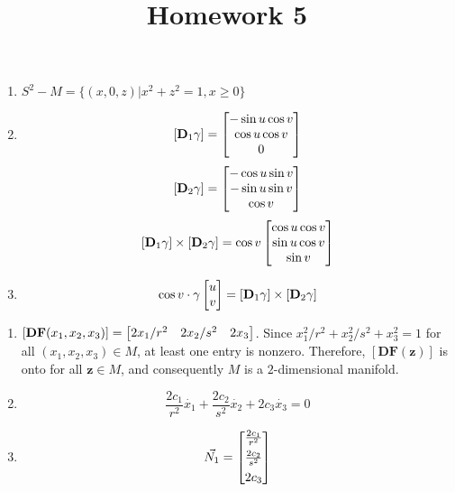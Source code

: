 \documentclass{homework}
\title{Homework 5}
\begin{document}
\maketitle

\begin{problem}{1}
\begin{enumerate}
\item $S^2 - M = \{(x, 0, z) | x^2 + z^2 = 1, x \geq 0\}$

\item
$$[\mathbf{D}_1\gamma] = \begin{bmatrix}-\sin u \cos v\\
                                \cos u \cos v\\
                                0\end{bmatrix}$$
$$[\mathbf{D}_2\gamma] = \begin{bmatrix}-\cos u \sin v\\
                               -\sin u \sin v\\
                                \cos v\end{bmatrix}$$
$$[\mathbf{D}_1\gamma] \times [\mathbf{D}_2\gamma] =
\cos v \begin{bmatrix}\cos u \cos v\\
             \sin u \cos v\\
             \sin v\end{bmatrix}$$

\item
$$\cos v \cdot \gamma\begin{bmatrix}u\\v\end{bmatrix}
= [\mathbf{D}_1\gamma] \times [\mathbf{D}_2\gamma]$$
\end{enumerate}
\end{problem}

\begin{problem}{2}
\begin{enumerate}
\item $[\mathbf{DF}(x_1, x_2, x_3)] = \begin{bmatrix}2x_1/r^2 & 2x_2/s^2 & 2x_3\end{bmatrix}$. Since
$x_1^2/r^2 + x_2^2/s^2 + x_3^2 = 1$ for all $(x_1, x_2, x_3) \in M$, at least
one entry is nonzero. Therefore, $[\mathbf{DF}(\mathbf{z})]$ is onto for all
$\mathbf{z} \in M$, and consequently $M$ is a $2$-dimensional manifold. \QED

\item $$\frac{2c_1}{r^2}\dot{x_1} +
        \frac{2c_2}{s^2}\dot{x_2} +
                    2c_3\dot{x_3} = 0$$

\item $$\vec{N_1} = \begin{bmatrix}\frac{2c_1}{r^2}\\[4pt]
                          \frac{2c_2}{s^2}\\[4pt]
                          2c_3\end{bmatrix}$$
\end{enumerate}
\end{problem}
\end{document}
